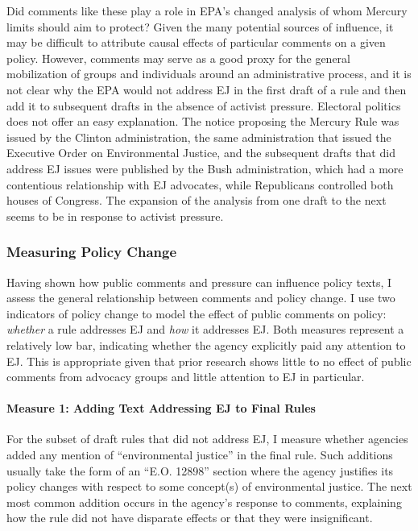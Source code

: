 \documentclass[
      12pt,
        ]{article}
\begin{document}
Did comments like these play a role in EPA's changed analysis of
whom Mercury limits should aim to protect?
Given the many potential sources of influence, it may be difficult to
attribute causal effects of particular comments on a given policy.
However, comments may serve as a good proxy for the general mobilization
of groups and individuals around an administrative process, and it is
not clear why the EPA would not address EJ in the first
draft of a rule and then add it to subsequent drafts in the absence of
activist pressure. Electoral politics does not offer an easy
explanation. The notice proposing the Mercury Rule was issued by the
Clinton administration, the same administration that issued the
Executive Order on Environmental Justice, and the subsequent drafts that
did address EJ issues were published by the Bush
administration, which had a more contentious relationship with
EJ advocates, while Republicans controlled both
houses of Congress. The expansion of the analysis from one draft to the
next seems to be in response to activist pressure.

\hypertarget{measuring-policy-change}{%
\subsubsection{Measuring Policy Change}\label{measuring-policy-change}}

Having shown how public comments and pressure can influence policy texts, I assess the general relationship between comments and policy change. I use two indicators of policy change to model the effect of public comments on policy: \emph{whether} a rule addresses EJ and \emph{how} it addresses EJ. Both measures represent a relatively low bar, indicating whether the agency explicitly paid any attention to EJ. This is appropriate given that prior research shows little to no effect of public comments from advocacy groups and little attention to EJ in particular.

\hypertarget{measure-1-adding-text-addressing-ej-to-final-rules}{%
\paragraph{Measure 1: Adding Text Addressing EJ to Final Rules}\label{measure-1-adding-text-addressing-ej-to-final-rules}}

For the subset of draft rules that did not address EJ, I measure whether agencies added any mention of ``environmental justice'' in the final rule. Such additions usually take the form of an ``E.O. 12898'' section where the agency justifies its policy changes with respect to some concept(s) of environmental justice. The next most common addition occurs in the agency's response to comments, explaining how the rule did not have disparate effects or that they were insignificant.
\end{document}
